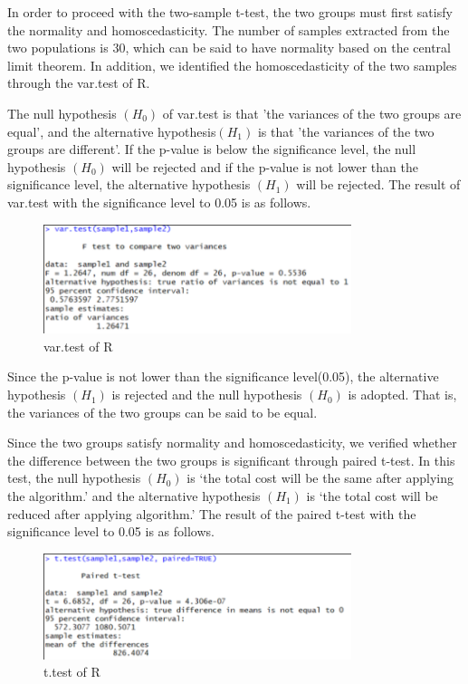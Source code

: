 In order to proceed with the two-sample t-test, the two groups must first satisfy the normality and homoscedasticity. The number of samples extracted from the two populations is 30, which can be said to have normality based on the central limit theorem. In addition, we identified the homoscedasticity of the two samples through the var.test of R.

The null hypothesis $(H_{0})$ of var.test is that 'the variances of the two groups are equal', and the alternative hypothesis$(H_{1})$ is that 'the variances of the two groups are different'. 
If the p-value is below the significance level, the null hypothesis $(H_{0})$ will be rejected and if the p-value is not lower than the significance level, the alternative hypothesis $(H_{1})$ will be rejected.  The result of var.test with the significance level to 0.05 is as follows.

\begin{figure}[h!]
	\centering
	\includegraphics[width=9cm]{vartest.pdf}
	\caption{var.test of R}
	\label{fig:vartest}       %
\end{figure}

Since the p-value is not lower than the significance level(0.05), the alternative hypothesis $(H_{1})$ is rejected and the null hypothesis $(H_{0})$ is adopted. 
That is, the variances of the two groups can be said to be equal.

Since the two groups satisfy normality and homoscedasticity, we verified whether the difference between the two groups is significant through paired t-test. In this test, the null hypothesis $(H_{0})$ is ‘the total cost will be the same after applying the algorithm.’ and the alternative hypothesis $(H_{1})$ is ‘the total cost will be reduced after applying algorithm.’ The result of the paired t-test with the significance level to 0.05 is as follows.

\begin{figure}[h!]
	\centering
	\includegraphics[width=9cm]{ttest.pdf}
	\caption{t.test of R}
	\label{fig:ttest}       %
\end{figure}

